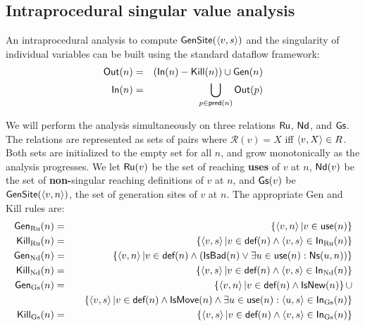 \documentclass[11pt,notitlepage]{article}
\newcommand{\func}[1]{\ensuremath{\text{\sffamily #1}}}
\begin{document}
\subsection{Intraprocedural singular value analysis}

An intraprocedural analysis to compute $\func{GenSite}(\tuple{v,s})$ and the
singularity of individual variables can be built using the standard
dataflow framework:
\begin{eqnarray*}
\func{Out}(n)&=&\left(\func{In}(n)-\func{Kill}(n)\right)\cup\func{Gen}(n) \\
\func{In}(n)&=&\bigcup_{p\in\func{pred}(n)} \func{Out}(p)\\
\end{eqnarray*}

We will perform the analysis simultaneously on three relations
$\func{Ru}$, $\func{Nd}$, and $\func{Gs}$.
The relations are represented as
sets of pairs  where
$\mathcal{R}(v)=X$ iff $\left\langle v,X \right\rangle \in R$.
Both sets are initialized
to the empty set for all $n$, and grow monotonically as the analysis
progresses.
We let
$\func{Ru}(v)$ be the set of reaching \textbf{uses} of $v$ at $n$,
$\func{Nd}(v)$ be the set of \textbf{non-}singular reaching definitions
of $v$ at $n$,
 and
$\func{Gs}(v)$ be $\func{GenSite}(\tuple{v,n})$, the set of generation sites
of $v$ at $n$.
The appropriate Gen and Kill rules are:
\begin{eqnarray*}
\func{Gen}_\text{Ru}(n) &=&
        \left\{ \tuple{v, n} | v \in \func{use}(n) \right\} \\
\func{Kill}_\text{Ru}(n) &=&
        \left\{ \tuple{v, s} | v \in \func{def}(n) \wedge
                          \tuple{v,s} \in \func{In}_\text{Ru}(n) \right\} \\
%
\func{Gen}_\text{Nd}(n) &=&
        \left\{ \tuple{v, n} | v \in \func{def}(n) \wedge
\left( \func{IsBad}(n) \vee
\exists u\in\func{use}(n):\func{Ns}(u,n)
 \right) \right\}
\\
\func{Kill}_\text{Nd}(n) &=&
        \left\{ \tuple{v, s} | v \in \func{def}(n) \wedge
                          \tuple{v,s} \in \func{In}_\text{Nd}(n) \right\} \\
\func{Gen}_\text{Gs}(n) &=&
       \left\{ \tuple{v, n} | v \in \func{def}(n)\wedge\func{IsNew}(n)\right\}
       \cup\\&&\quad
       \left\{ \tuple{v, s} | v \in \func{def}(n)\wedge\func{IsMove}(n) \wedge
                              \exists u\in\func{use}(n) :
                                 \tuple{u,s}\in \func{In}_\text{Gs}(n)\right\}
\\
\func{Kill}_\text{Gs}(n) &=&
       \left\{ \tuple{v, s} | v \in \func{def}(n) \wedge
                         \tuple{v,s} \in \func{In}_\text{Gs}(n) \right\} %
\end{eqnarray*}
\end{document}
